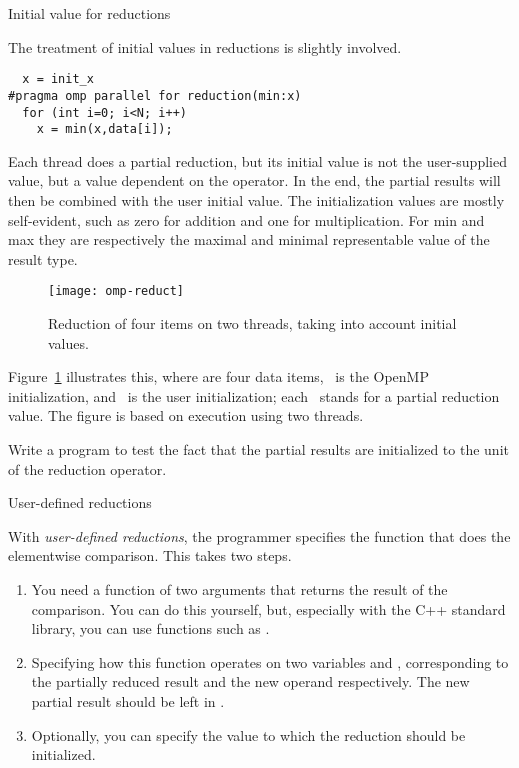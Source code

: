  {Initial value for reductions}

The treatment of initial values in reductions is slightly involved.
\begin{lstlisting}
  x = init_x
#pragma omp parallel for reduction(min:x)
  for (int i=0; i<N; i++)
    x = min(x,data[i]);
\end{lstlisting}
Each thread does a partial reduction, but its initial value is not the
user-supplied  value, but a value dependent on the
operator. In the end, the partial results will then be combined with
the user initial value.
The initialization values are mostly self-evident, such as zero for
addition and one for multiplication. For min and max they are
respectively the maximal and minimal representable value of the result type.

\begin{figure}[ht]
  \texttt{[image: omp-reduct]}
  \caption{Reduction of four items on two threads, taking into account
    initial values.}
  \label{fig:omp-reduct}  
\end{figure}
%
Figure~\ref{fig:omp-reduct} illustrates this, where  are
four data items, ~is the OpenMP initialization, and ~is the
user initialization; each ~stands for a partial reduction value.
The figure is based on execution using two threads.

\begin{exercise}
  Write a program to test the fact that the partial results
  are initialized to the unit of the reduction operator.
\end{exercise}

 {User-defined reductions}

With \emph{user-defined reductions}, the programmer specifies the
function that does the elementwise comparison.
This takes two steps.
\begin{enumerate}
\item You need a function of two arguments that returns the result of
  the comparison. You can do this yourself, but, especially with the
  C++ standard library, you can use functions such as .
\item Specifying how this function operates on two variables
   and , corresponding to the
  partially reduced result and the new operand respectively. The new
  partial result should be left in .
\item Optionally, you can specify the value to which the reduction
  should be initialized.
\end{enumerate}

